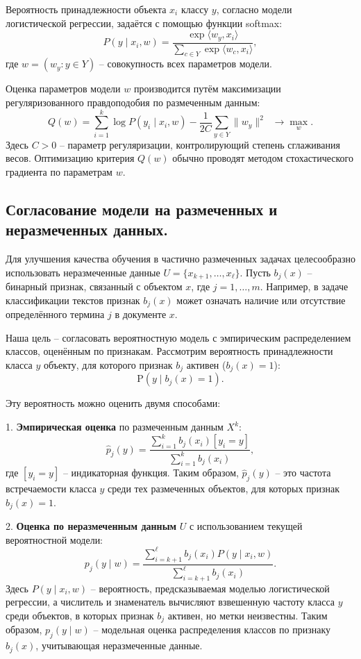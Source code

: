 Вероятность принадлежности объекта $x_i$ классу $y$, согласно модели логистической регрессии, задаётся с помощью функции softmax:
\[
P(y \mid x_i, w) = \frac{\exp\langle w_y, x_i \rangle}{\sum_{c \in Y} \exp\langle w_c, x_i \rangle},
\]
где $w = (w_y: y \in Y)$ – совокупность всех параметров модели.

Оценка параметров модели $w$ производится путём максимизации регуляризованного правдоподобия по размеченным данным:
\[
Q(w) = \sum_{i=1}^k \log P(y_i \mid x_i, w) - \frac{1}{2C}\sum_{y \in Y}\|w_y\|^2 \;\; \to \max_w.
\]
Здесь $C > 0$ – параметр регуляризации, контролирующий степень сглаживания весов. Оптимизацию критерия $Q(w)$ обычно проводят методом стохастического градиента по параметрам $w$.

\subsection{Согласование модели на размеченных и неразмеченных данных.}

Для улучшения качества обучения в частично размеченных задачах целесообразно использовать неразмеченные данные $U = \{x_{k+1}, \ldots, x_{\ell}\}$. Пусть $b_j(x)$ – бинарный признак, связанный с объектом $x$, где $j = 1, \ldots, m$. Например, в задаче классификации текстов признак $b_j(x)$ может означать наличие или отсутствие определённого термина $j$ в документе $x$. 

Наша цель – согласовать вероятностную модель с эмпирическим распределением классов, оценённым по признакам. Рассмотрим вероятность принадлежности класса $y$ объекту, для которого признак $b_j$ активен ($b_j(x)=1$):
\[
\mathrm{P}(y \mid b_j(x)=1).
\]

Эту вероятность можно оценить двумя способами:

1. \textbf{Эмпирическая оценка} по размеченным данным $X^k$:
\[
\hat{p}_j(y) = \frac{\sum_{i=1}^k b_j(x_i)[y_i = y]}{\sum_{i=1}^k b_j(x_i)},
\]
где $[y_i = y]$ – индикаторная функция. Таким образом, $\hat{p}_j(y)$ – это частота встречаемости класса $y$ среди тех размеченных объектов, для которых признак $b_j(x)=1$.

2. \textbf{Оценка по неразмеченным данным} $U$ с использованием текущей вероятностной модели:
\[
p_j(y \mid w) = \frac{\sum_{i=k+1}^{\ell} b_j(x_i) P(y \mid x_i, w)}{\sum_{i=k+1}^{\ell} b_j(x_i)}.
\]
Здесь $P(y \mid x_i, w)$ – вероятность, предсказываемая моделью логистической регрессии, а числитель и знаменатель вычисляют взвешенную частоту класса $y$ среди объектов, в которых признак $b_j$ активен, но метки неизвестны. Таким образом, $p_j(y \mid w)$ – модельная оценка распределения классов по признаку $b_j(x)$, учитывающая неразмеченные данные.

